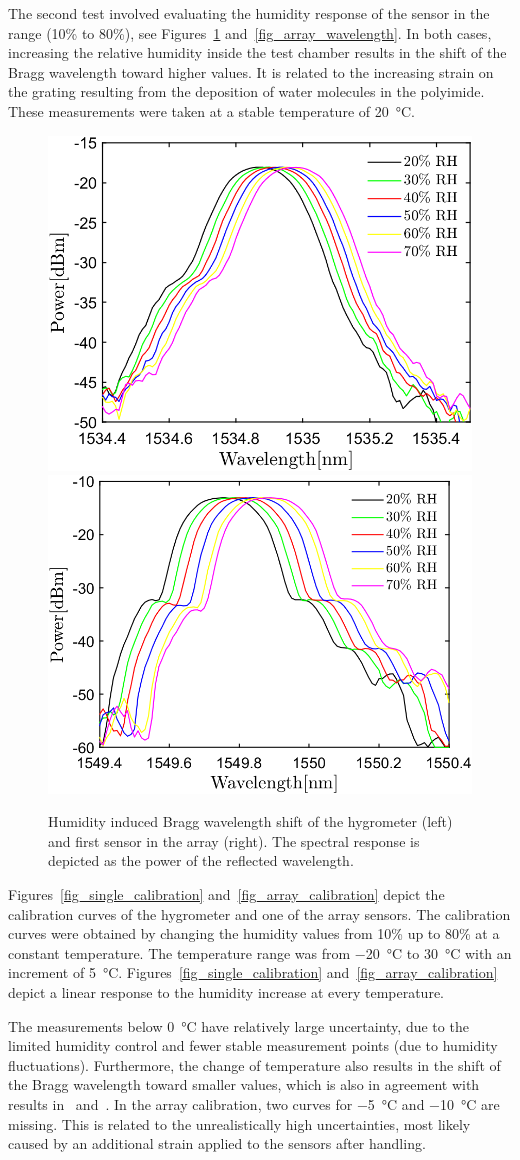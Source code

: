 The second test involved evaluating the humidity response of the sensor in the range (10\% to 80\%), see Figures~\ref{fig_response} and~\ref{fig_array_wavelength}. In both cases, increasing the relative humidity inside the test chamber results in the shift of the Bragg wavelength toward higher values. It is related to the increasing strain on the grating resulting from the deposition of water molecules in the polyimide. These measurements were taken at a stable temperature of \SI{20}{\celsius}.
\begin{figure}[!h]
\centering
\includegraphics[width=0.45\columnwidth]{Chapter5/images/rh.png}
\includegraphics[width=0.475\columnwidth]{Chapter5/images/rh_array2.png}
\caption{Humidity induced Bragg wavelength shift of the hygrometer (left) and first sensor in the array (right). The spectral response is depicted as the power of the reflected wavelength. }
\label{fig_response}
\end{figure}
Figures~\ref{fig_single_calibration} and~\ref{fig_array_calibration} depict the calibration curves of the hygrometer and one of the array sensors. The calibration curves were obtained by changing the humidity values from 10\% up to 80\% at a constant temperature. The temperature range was from \SI{-20}{\celsius} to \SI{30}{\celsius} with an increment of \SI{5}{\celsius}. Figures~\ref{fig_single_calibration} and~\ref{fig_array_calibration} depict a linear response to the humidity increase at every temperature.

The measurements below \SI{0}{\celsius} have relatively large uncertainty, due to the limited humidity control and fewer stable measurement points (due to humidity fluctuations). Furthermore, the change of temperature also results in the shift of the Bragg wavelength toward smaller values, which is also in agreement with results in~\cite{Kronenberg:02} and~\cite{Berruti}. In the array calibration, two curves for \SI{-5}{\celsius} and \SI{-10}{\celsius} are missing. This is related to the unrealistically high uncertainties, most likely caused by an additional strain applied to the sensors after handling. %

